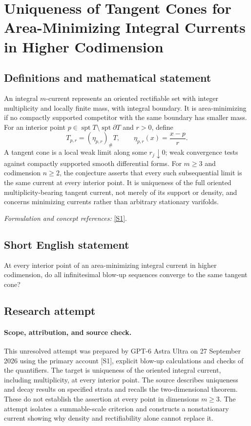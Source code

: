 \documentclass[11pt]{article}
\begin{document}
\section*{\texorpdfstring{Uniqueness of Tangent Cones for Area-Minimizing Integral Currents in Higher Codimension}{Uniqueness of Tangent Cones for Area-Minimizing Integral Currents in Higher Codimension}}\label{statement}
\subsection{Definitions and mathematical statement}
An integral $m$-current represents an oriented rectifiable set with integer multiplicity and locally finite mass, with integral boundary. It is area-minimizing if no compactly supported competitor with the same boundary has smaller mass. For an interior point $p\in\operatorname{spt}T\setminus\operatorname{spt}\partial T$ and $r>0$, define
\[
 T_{p,r}=(\eta_{p,r})_\#T,
 \qquad\eta_{p,r}(x)=\frac{x-p}{r}.
\]
A tangent cone is a local weak limit along some $r_j\downarrow0$; weak convergence tests against compactly supported smooth differential forms. For $m\ge3$ and codimension $n\ge2$, the conjecture asserts that every such subsequential limit is the same current at every interior point. It is uniqueness of the full oriented multiplicity-bearing tangent current, not merely of its support or density, and concerns minimizing currents rather than arbitrary stationary varifolds.
\par\smallskip\textit{Formulation and concept references:} \href{https://proceedings.centre-mersenne.org/item/10.5802/slsedp.175.pdf}{[S1]}.

\subsection{Short English statement}
At every interior point of an area-minimizing integral current in higher codimension, do all infinitesimal blow-up sequences converge to the same tangent cone?
\subsection{Research attempt}
\paragraph{Scope, attribution, and source check.}
This unresolved attempt was prepared by GPT-6 Astra Ultra on 27 September
2026 using the primary account [S1], explicit blow-up calculations and
checks of the quantifiers. The target is uniqueness of the oriented
integral current, including multiplicity, at every interior point.
The source describes uniqueness and decay results on specified strata
and recalls the two-dimensional theorem. These do not establish the
assertion at every point in dimensions $m\geq3$. The attempt isolates
a summable-scale criterion and constructs a nonstationary current
showing why density and rectifiability alone cannot replace it.
\end{document}
